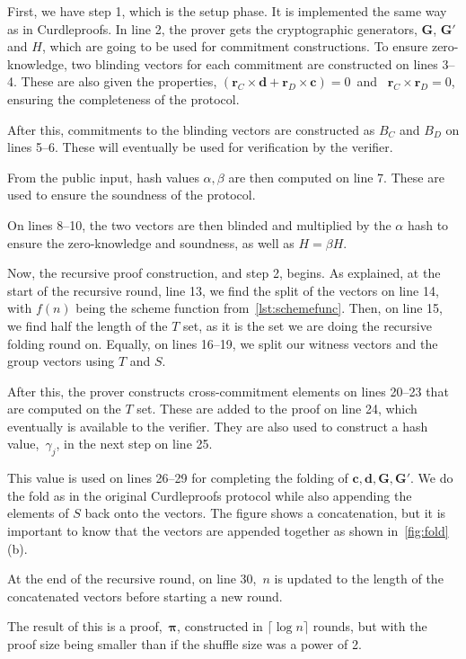 First, we have step 1, which is the setup phase.
It is implemented the same way as in Curdleproofs.
In line 2, the prover gets the cryptographic generators, $\mathbf{G}$, $\mathbf{G}'$ and $H$, which are going to be used for commitment constructions.
To ensure zero-knowledge, two blinding vectors for each commitment are constructed on lines 3--4.
These are also given the properties, $(\mathbf{r}_C\times \mathbf{d}+\mathbf{r}_D\times \mathbf{c})=0$~and~ $\mathbf{r}_C\times\mathbf{r}_D=0$, ensuring the completeness of the protocol.

After this, commitments to the blinding vectors are constructed as $B_C$ and $B_D$ on lines 5--6.
These will eventually be used for verification by the verifier.

From the public input, hash values $\alpha,\beta$ are then computed on line 7.
These are used to ensure the soundness of the protocol.

On lines 8--10, the two vectors are then blinded and multiplied by the $\alpha$ hash to ensure the zero-knowledge and soundness, as well as $H=\beta H$.


Now, the recursive proof construction, and step 2, begins.
As explained, at the start of the recursive round, line 13, we find the split of the vectors on line 14, with $f(n)$ being the scheme function from~\autoref{lst:schemefunc}.
Then, on line 15, we find half the length of the $T$ set, as it is the set we are doing the recursive folding round on.
Equally, on lines 16--19, we split our witness vectors and the group vectors using $T$ and $S$.

After this, the prover constructs cross-commitment elements on lines 20--23 that are computed on the $T$ set.
These are added to the proof on line 24, which eventually is available to the verifier.
They are also used to construct a hash value,~$\gamma_j$, in the next step on line 25.

This value is used on lines 26--29 for completing the folding of $\mathbf{c},\mathbf{d},\mathbf{G},\mathbf{G'}$.
We do the fold as in the original Curdleproofs protocol while also appending the elements of $S$ back onto the vectors.
The figure shows a concatenation, but it is important to know that the vectors are appended together as shown in~\autoref{fig:fold}(b).

At the end of the recursive round, on line 30,~$n$ is updated to the length of the concatenated vectors before starting a new round.

The result of this is a proof,~$\mathbf{\pi}$, constructed in $\lceil \log n \rceil$ rounds, but with the proof size being smaller than if the shuffle size was a power of 2.

